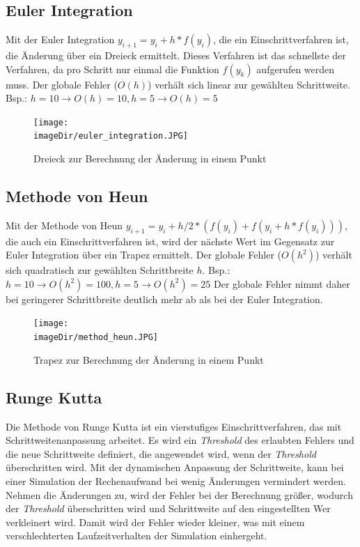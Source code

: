 \documentclass[11pt, a4paper, twoside]{article}   	%
\newcommand{\imageDir}{./images/}
\begin{document}
\subsection{Euler Integration}
Mit der Euler Integration $y_{i+1}=y_i+h*f(y_i)$, die ein Einschrittverfahren ist, die Änderung über ein Dreieck ermittelt. Dieses Verfahren ist das schnellste der Verfahren, da pro Schritt nur einmal die Funktion $f(y_k)$ aufgerufen werden muss. Der globale Fehler ($O(h)$) verhält sich linear zur gewählten Schrittweite.
\newline
\newline
Bsp.: $h=10 \rightarrow O(h)=10, h=5 \rightarrow O(h)=5$

\begin{figure}[h]
\centering
\texttt{[image: \\imageDir/euler\_integration.JPG]}
\caption{Dreieck zur Berechnung der Änderung in einem Punkt}
\label{fig:euler-integration}
\end{figure}

\subsection{Methode von Heun}
Mit der Methode von Heun $y_{i+1}=y_i+h/2*(f(y_i) + f(y_i+h*f(y_i)))$, die auch ein Einschrittverfahren ist, wird der nächste Wert im Gegensatz zur Euler Integration über ein Trapez ermittelt. Der globale Fehler ($O(h^2)$) verhält sich quadratisch zur gewählten Schrittbreite $h$. 
\newline
\newline
Bsp.: $h=10 \rightarrow O(h^2)=100, h=5 \rightarrow O(h^2)=25$
\newline
\newline
Der globale Fehler nimmt daher bei geringerer Schrittbreite deutlich mehr ab als bei der Euler Integration.

\begin{figure}[h]
\centering
\texttt{[image: \\imageDir/method\_heun.JPG]}
\caption{Trapez zur Berechnung der Änderung in einem Punkt}
\label{fig:euler-integration}
\end{figure}

\subsection{Runge Kutta}
Die Methode von Runge Kutta ist ein vierstufiges Einschrittverfahren, das mit Schrittweitenanpassung arbeitet. Es wird ein \emph{Threshold} des erlaubten Fehlers und die neue Schrittweite definiert, die angewendet wird, wenn der \emph{Threshold}  überschritten wird. Mit der dynamischen Anpassung der Schrittweite, kann bei einer Simulation der Rechenaufwand bei wenig Änderungen vermindert werden. Nehmen die Änderungen zu, wird der Fehler bei der Berechnung  größer, wodurch der \emph{Threshold} überschritten wird und Schrittweite auf den eingestellten Wer verkleinert wird. Damit wird der Fehler wieder kleiner, was mit einem verschlechterten Laufzeitverhalten der Simulation einhergeht.
\end{document}
